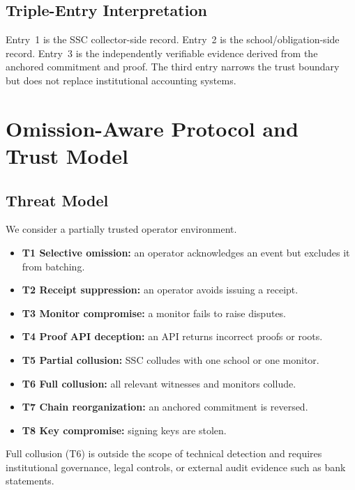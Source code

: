 \documentclass[journal]{IEEEtran}
\begin{document}
\subsection{Triple-Entry Interpretation}
Entry~1 is the SSC collector-side record. Entry~2 is the school/obligation-side record. Entry~3 is the independently verifiable evidence derived from the anchored commitment and proof. The third entry narrows the trust boundary but does not replace institutional accounting systems.

\section{Omission-Aware Protocol and Trust Model}
\label{sec:omission}

\subsection{Threat Model}
We consider a partially trusted operator environment.

\begin{itemize}[nosep,leftmargin=2em]
    \item \textbf{T1 Selective omission:} an operator acknowledges an event but excludes it from batching.
    \item \textbf{T2 Receipt suppression:} an operator avoids issuing a receipt.
    \item \textbf{T3 Monitor compromise:} a monitor fails to raise disputes.
    \item \textbf{T4 Proof API deception:} an API returns incorrect proofs or roots.
    \item \textbf{T5 Partial collusion:} SSC colludes with one school or one monitor.
    \item \textbf{T6 Full collusion:} all relevant witnesses and monitors collude.
    \item \textbf{T7 Chain reorganization:} an anchored commitment is reversed.
    \item \textbf{T8 Key compromise:} signing keys are stolen.
\end{itemize}

Full collusion (T6) is outside the scope of technical detection and requires institutional governance, legal controls, or external audit evidence such as bank statements.
\end{document}
